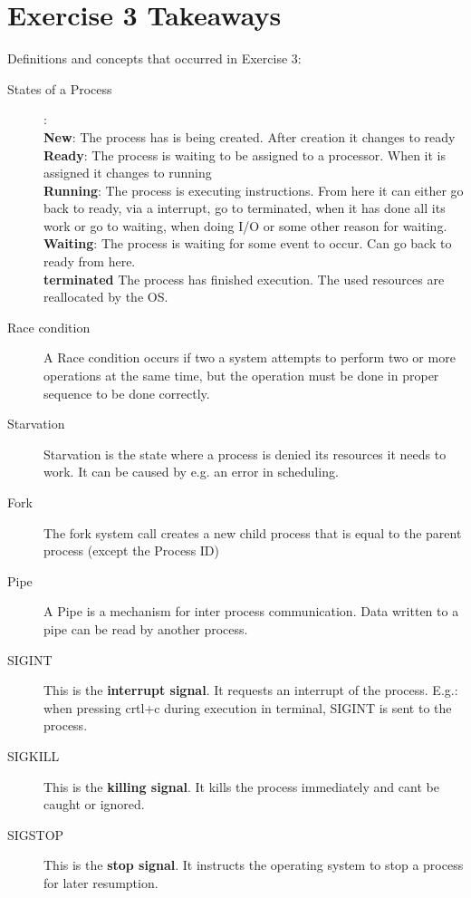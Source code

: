 \documentclass{article}
\begin{document}
	\section*{Exercise 3 Takeaways}
   Definitions and concepts that occurred in Exercise 3:
	\begin{description}
		\item[States of a Process]:\\
			\textbf{New}: The process has is being created. After creation it changes to ready\\
			\textbf{Ready}: The process is waiting to be assigned to a processor. When it is assigned it changes to running\\
			\textbf{Running}: The process is executing instructions. From here it can either go back to ready, via a interrupt, go to terminated, when it has done all its work or go to waiting, when doing I/O or some other reason for waiting.\\
			\textbf{Waiting}: The process is waiting for some event to occur. Can go back to ready from here.\\ 
			\textbf{terminated} The process has finished execution. The used resources are reallocated by the OS.
		
		\item[Race condition] A Race condition occurs if two a system attempts to perform two or more operations at the same time, but the operation must be done in proper sequence to be done correctly. 
		
		\item[Starvation] Starvation is the state where a process is denied its resources it needs to work. It can be caused by e.g. an error in scheduling. 
		
		\item[Fork] The fork system call creates a new child process that is equal to the parent process (except the Process ID)
		
		\item[Pipe] A Pipe is a mechanism for inter process communication. Data written to a pipe can be read by another process. 
		
		\item[SIGINT] This is the \textbf{interrupt signal}. It requests an interrupt of the process. E.g.: when pressing crtl+c during execution in terminal, SIGINT is sent to the process.
		 
		\item[SIGKILL] This is the \textbf{killing signal}. It kills the process immediately and cant be caught or ignored. 
		
		\item[SIGSTOP] This is the \textbf{stop signal}. It instructs the operating system to stop a process for later resumption. 
		
	\end{description}
	
\end{document}
